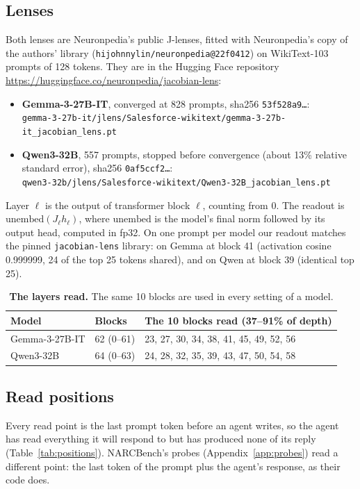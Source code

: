 \documentclass[11pt]{article}
\begin{document}
\subsection{Lenses}\label{app:lenses}
Both lenses are Neuronpedia's public J-lenses, fitted with Neuronpedia's copy of the authors' library (\texttt{hijohnnylin/neuronpedia@22f0412}) on WikiText-103 prompts of 128 tokens. They are in the Hugging Face repository \url{https://huggingface.co/neuronpedia/jacobian-lens}:
\begin{itemize}
\item \textbf{Gemma-3-27B-IT}, converged at 828 prompts, sha256 \texttt{53f528a9\ldots}:\\ {\footnotesize\nolinkurl{gemma-3-27b-it/jlens/Salesforce-wikitext/gemma-3-27b-it_jacobian_lens.pt}}
\item \textbf{Qwen3-32B}, 557 prompts, stopped before convergence (about 13\% relative standard error), sha256 \texttt{0af5ccf2\ldots}:\\ {\footnotesize\nolinkurl{qwen3-32b/jlens/Salesforce-wikitext/Qwen3-32B_jacobian_lens.pt}}
\end{itemize}
Layer $\ell$ is the output of transformer block $\ell$, counting from 0. The readout is $\mathrm{unembed}(J_\ell h_\ell)$, where $\mathrm{unembed}$ is the model's final norm followed by its output head, computed in fp32. On one prompt per model our readout matches the pinned \texttt{jacobian-lens} library: on Gemma at block 41 (activation cosine 0.999999, 24 of the top 25 tokens shared), and on Qwen at block 39 (identical top 25).

\begin{table}[h]
\centering\small
\begin{tabular}{lll}
\toprule
Model & Blocks & The 10 blocks read (37--91\% of depth)\\
\midrule
Gemma-3-27B-IT & 62 (0--61) & 23, 27, 30, 34, 38, 41, 45, 49, 52, 56\\
Qwen3-32B & 64 (0--63) & 24, 28, 32, 35, 39, 43, 47, 50, 54, 58\\
\bottomrule
\end{tabular}
\caption{\textbf{The layers read.} The same 10 blocks are used in every setting of a model.}
\label{tab:layers}
\end{table}

\subsection{Read positions}\label{app:positions}
Every read point is the last prompt token before an agent writes, so the agent has read everything it will respond to but has produced none of its reply (Table~\ref{tab:positions}). NARCBench's probes (Appendix~\ref{app:probes}) read a different point: the last token of the prompt plus the agent's response, as their code does.
\end{document}
